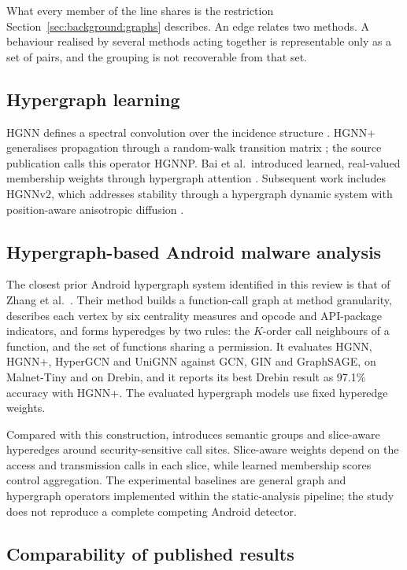 What every member of the line shares is the restriction Section~\ref{sec:background:graphs}
describes. An edge relates two methods. A behaviour realised by several methods acting together
is representable only as a set of pairs, and the grouping is not recoverable from that set.

\subsection*{Hypergraph learning}

HGNN defines a spectral convolution over the incidence structure \cite{feng2019hypergraph}.
HGNN+ generalises propagation through a random-walk transition matrix \cite{gao2023hgnn}; the
source publication calls this operator HGNNP. Bai et al.\ introduced learned, real-valued
membership weights through hypergraph attention \cite{bai2021hypergraphattention}.
Subsequent work includes HGNNv2, which addresses stability through a hypergraph dynamic system
with position-aware anisotropic diffusion \cite{gao2026hgnnv2}.

\subsection*{Hypergraph-based Android malware analysis}

The closest prior Android hypergraph system identified in this review is that of Zhang et al.\
\cite{zhang2023android}. Their method builds a function-call graph at method granularity, describes
each vertex by six centrality measures and opcode and API-package indicators,
and forms hyperedges by two rules: the $K$-order call neighbours of a function, and the set of
functions sharing a permission. It evaluates HGNN, HGNN+, HyperGCN and UniGNN against GCN, GIN and
GraphSAGE, on Malnet-Tiny and on Drebin, and it reports its best Drebin result as 97.1\%
accuracy with HGNN+. The evaluated hypergraph models use fixed hyperedge weights.

Compared with this construction, \hgann{} introduces semantic groups and slice-aware hyperedges
around security-sensitive call sites. Slice-aware weights depend on the access and transmission
calls in each slice, while learned membership scores control aggregation. The experimental
baselines are general graph and hypergraph operators implemented within the static-analysis
pipeline; the study does not reproduce a complete competing Android detector.

\subsection*{Comparability of published results}

